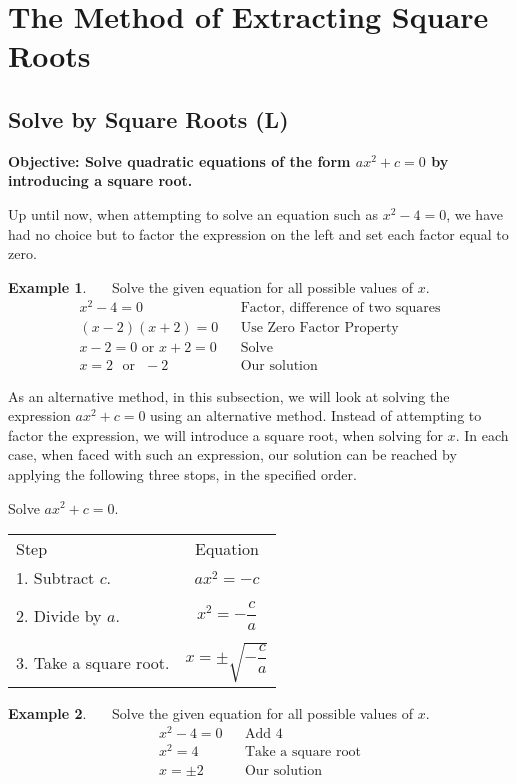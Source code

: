 \documentclass[12pt]{book}
\theoremstyle{definition}
\newtheorem{example}{Example}
\begin{document}
\section{The Method of Extracting Square Roots}
\subsection{Solve by Square Roots (L)}
{\bf Objective: Solve quadratic equations of the form $ax^2+c=0$ by introducing a square root.}\par
Up until now, when attempting to solve an equation such as $x^2-4=0$, we have had no choice but to factor the expression on the left and set each factor equal to zero.  
\begin{example}~~~Solve the given equation for all possible values of $x$.
\begin{eqnarray*}
x^2-4=0 & & \text{Factor,~difference~of~two~squares}\\
(x-2)(x+2)=0 & & \text{Use~Zero~Factor~Property}\\
x-2=0 \text{~or~} x+2=0 & & \text{Solve}\\
x=2 \text{~~or~~} -2 & & \text{Our~solution}
\end{eqnarray*}
\end{example}
As an alternative method, in this subsection, we will look at solving the expression $ax^2+c=0$ using an alternative method.  Instead of attempting to factor the expression, we will introduce a square root, when solving for $x$.  In each case, when faced with such an expression, our solution can be reached by applying the following three stops, in the specified order.
\begin{center}
Solve $ax^2+c=0$.\par
\begin{tabular}{lc}
Step & Equation\\
1. Subtract $c$. & $ax^2=-c$\\
& \\
2. Divide by $a$. & $x^2=-\dfrac{c}{a}$\\
& \\
3. Take a square root. & $x=\pm\sqrt{-\dfrac{c}{a}}$
\end{tabular}
\end{center}
\begin{example}~~~Solve the given equation for all possible values of $x$.
\begin{eqnarray*}
x^2-4=0 & & \text{Add \ 4}\\
x^2=4 & & \text{Take \ a \ square \ root}\\
x=\pm 2 & & \text{Our \ solution}
\end{eqnarray*}
\end{example}
\end{document}

